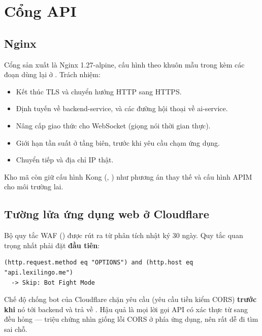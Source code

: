 \section{Cổng API}

\subsection{Nginx}

Cổng sản xuất là Nginx 1.27-alpine, cấu hình theo khuôn mẫu trong
 kèm các đoạn dùng lại ở . Trách nhiệm:

\begin{itemize}[leftmargin=1.4em]
  \item Kết thúc TLS và chuyển hướng HTTP sang HTTPS.
  \item Định tuyến  về backend-service,  và các đường hội thoại
  về ai-service.
  \item Nâng cấp giao thức cho WebSocket (giọng nói thời gian thực).
  \item Giới hạn tần suất ở tầng biên, trước khi yêu cầu chạm ứng dụng.
  \item Chuyển tiếp  và địa chỉ IP thật.
\end{itemize}

Kho mã còn giữ cấu hình Kong (,
) như phương án thay thế và cấu hình APIM cho môi trường
lai.

\subsection{Tường lửa ứng dụng web ở Cloudflare}

Bộ quy tắc WAF () được rút ra từ phân tích nhật ký
30 ngày. Quy tắc quan trọng nhất phải đặt \textbf{đầu tiên}:

\begin{lstlisting}
(http.request.method eq "OPTIONS") and (http.host eq "api.lexilingo.me")
  -> Skip: Bot Fight Mode
\end{lstlisting}

\begin{luuy}
Chế độ chống bot của Cloudflare chặn yêu cầu  (yêu cầu tiền kiểm CORS)
\textbf{trước khi} nó tới backend và trả về . Hậu quả là mọi
lời gọi API có xác thực từ  sang  đều hỏng —
triệu chứng nhìn giống lỗi CORS ở phía ứng dụng, nên rất dễ đi tìm sai chỗ.
\end{luuy}

